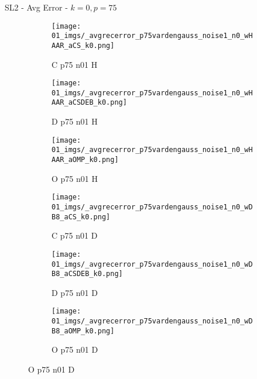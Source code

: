 \begin{frame}{SL2 - Avg Error - $k=0,p=75$}{}
\begin{figure}
\begin{subfigure}{0.13\textwidth}
\texttt{[image: 01\_imgs/\_avgrecerror\_p75vardengauss\_noise1\_n0\_wHAAR\_aCS\_k0.png]}
\caption*{\tiny C p75 n01 H}
\end{subfigure}
\begin{subfigure}{0.13\textwidth}
\texttt{[image: 01\_imgs/\_avgrecerror\_p75vardengauss\_noise1\_n0\_wHAAR\_aCSDEB\_k0.png]}
\caption*{\tiny D p75 n01 H}
\end{subfigure}
\begin{subfigure}{0.13\textwidth}
\texttt{[image: 01\_imgs/\_avgrecerror\_p75vardengauss\_noise1\_n0\_wHAAR\_aOMP\_k0.png]}
\caption*{\tiny O p75 n01 H}
\end{subfigure}
\begin{subfigure}{0.13\textwidth}
\texttt{[image: 01\_imgs/\_avgrecerror\_p75vardengauss\_noise1\_n0\_wDB8\_aCS\_k0.png]}
\caption*{\tiny C p75 n01 D}
\end{subfigure}
\begin{subfigure}{0.13\textwidth}
\texttt{[image: 01\_imgs/\_avgrecerror\_p75vardengauss\_noise1\_n0\_wDB8\_aCSDEB\_k0.png]}
\caption*{\tiny D p75 n01 D}
\end{subfigure}
\begin{subfigure}{0.13\textwidth}
\texttt{[image: 01\_imgs/\_avgrecerror\_p75vardengauss\_noise1\_n0\_wDB8\_aOMP\_k0.png]}
\caption*{\tiny O p75 n01 D}
\end{subfigure}

\vspace{5pt}


\end{figure}
\end{frame}
